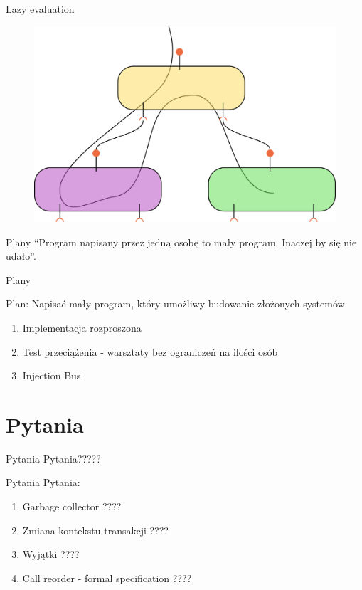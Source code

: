 \documentclass[smaller]{beamer}
\begin{document}
\begin{frame}{Lazy evaluation}
 \begin{figure}
 \centering
 \includegraphics[width=1\textwidth]{lazyExecutionFig}
\end{figure}
\end{frame}


\begin{frame}{Plany}
``Program napisany przez jedną osobę to mały program. Inaczej by się nie udało''.
\end{frame}

\begin{frame}{Plany}

Plan: Napisać mały program, który umożliwy budowanie złożonych systemów.

 \begin{enumerate}
  \item<2-> Implementacja rozproszona
  \item<3-> Test przeciążenia - warsztaty bez ograniczeń na ilości osób
  \item<4-> Injection Bus
 \end{enumerate}
\end{frame}

\section{Pytania}
\begin{frame}{Pytania}
Pytania?????
\end{frame}

\begin{frame}{Pytania}
Pytania:
\begin{enumerate}
 \item<1-> Garbage collector ????
 \item<2-> Zmiana kontekstu transakcji ????
 \item<3-> Wyjątki ????
 \item<4-> Call reorder - formal specification ????
\end{enumerate}

\end{frame}
\end{document}
